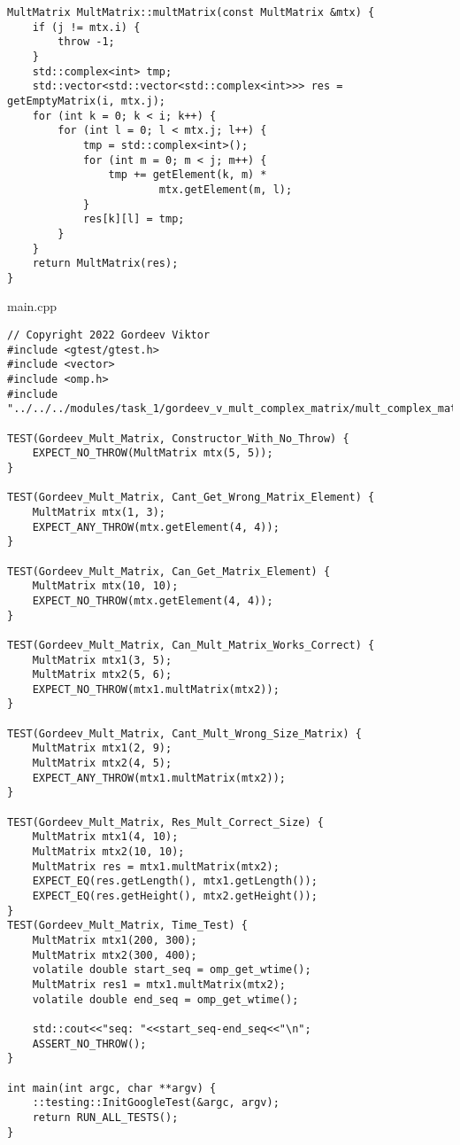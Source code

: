 \documentclass{report}
\begin{document}
\begin{enumerate}
\begin{lstlisting}
MultMatrix MultMatrix::multMatrix(const MultMatrix &mtx) {
    if (j != mtx.i) {
        throw -1;
    }
    std::complex<int> tmp;
    std::vector<std::vector<std::complex<int>>> res = getEmptyMatrix(i, mtx.j);
    for (int k = 0; k < i; k++) {
        for (int l = 0; l < mtx.j; l++) {
            tmp = std::complex<int>();
            for (int m = 0; m < j; m++) {
                tmp += getElement(k, m) *
                        mtx.getElement(m, l);
            }
            res[k][l] = tmp;
        }
    }
    return MultMatrix(res);
}

\end{lstlisting}
main.cpp
\begin{lstlisting}
// Copyright 2022 Gordeev Viktor
#include <gtest/gtest.h>
#include <vector>
#include <omp.h>
#include "../../../modules/task_1/gordeev_v_mult_complex_matrix/mult_complex_matrix.h"

TEST(Gordeev_Mult_Matrix, Constructor_With_No_Throw) {
    EXPECT_NO_THROW(MultMatrix mtx(5, 5));
}

TEST(Gordeev_Mult_Matrix, Cant_Get_Wrong_Matrix_Element) {
    MultMatrix mtx(1, 3);
    EXPECT_ANY_THROW(mtx.getElement(4, 4));
}

TEST(Gordeev_Mult_Matrix, Can_Get_Matrix_Element) {
    MultMatrix mtx(10, 10);
    EXPECT_NO_THROW(mtx.getElement(4, 4));
}

TEST(Gordeev_Mult_Matrix, Can_Mult_Matrix_Works_Correct) {
    MultMatrix mtx1(3, 5);
    MultMatrix mtx2(5, 6);
    EXPECT_NO_THROW(mtx1.multMatrix(mtx2));
}

TEST(Gordeev_Mult_Matrix, Cant_Mult_Wrong_Size_Matrix) {
    MultMatrix mtx1(2, 9);
    MultMatrix mtx2(4, 5);
    EXPECT_ANY_THROW(mtx1.multMatrix(mtx2));
}

TEST(Gordeev_Mult_Matrix, Res_Mult_Correct_Size) {
    MultMatrix mtx1(4, 10);
    MultMatrix mtx2(10, 10);
    MultMatrix res = mtx1.multMatrix(mtx2);
    EXPECT_EQ(res.getLength(), mtx1.getLength());
    EXPECT_EQ(res.getHeight(), mtx2.getHeight());
}
TEST(Gordeev_Mult_Matrix, Time_Test) {
    MultMatrix mtx1(200, 300);
    MultMatrix mtx2(300, 400);
    volatile double start_seq = omp_get_wtime();
    MultMatrix res1 = mtx1.multMatrix(mtx2);
    volatile double end_seq = omp_get_wtime();

    std::cout<<"seq: "<<start_seq-end_seq<<"\n";
    ASSERT_NO_THROW();
}

int main(int argc, char **argv) {
    ::testing::InitGoogleTest(&argc, argv);
    return RUN_ALL_TESTS();
}



\end{lstlisting}
\end{enumerate}
\end{document}
